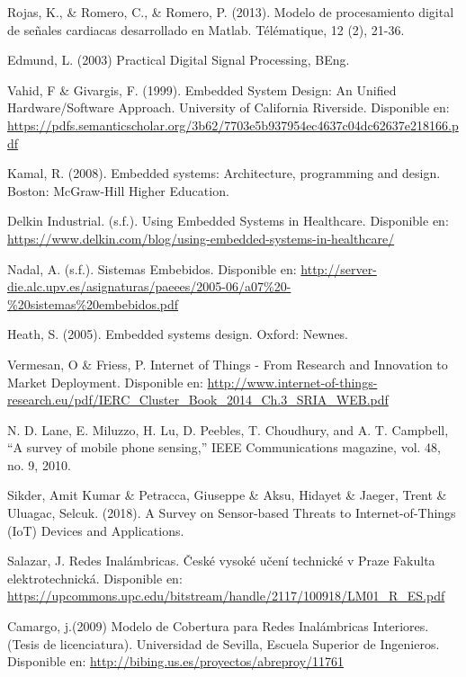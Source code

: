 \begin{thebibliography}{0}
	 Rojas, K., \& Romero, C., \& Romero, P. (2013). Modelo de procesamiento digital de señales cardiacas desarrollado en Matlab. Télématique, 12 (2), 21-36.
	
	 Edmund, L. (2003) Practical Digital Signal Processing, BEng.
	
		Vahid, F \& Givargis, F. (1999). Embedded System Design: An Unified Hardware/Software Approach. University of California Riverside. Disponible en: \url{https://pdfs.semanticscholar.org/3b62/7703e5b937954ec4637c04dc62637e218166.pdf}
	
	 Kamal, R. (2008). Embedded systems: Architecture, programming and design. Boston: McGraw-Hill Higher Education.
	
	 Delkin Industrial. (s.f.). Using Embedded Systems in Healthcare. Disponible en:  \url{https://www.delkin.com/blog/using-embedded-systems-in-healthcare/}
	
	 Nadal, A. (s.f.). Sistemas Embebidos. Disponible en:  \url{http://server-die.alc.upv.es/asignaturas/paeees/2005-06/a07%20-%20sistemas%20embebidos.pdf}
	
	 Heath, S. (2005). Embedded systems design. Oxford: Newnes.
	
	 Vermesan, O \& Friess, P. Internet of Things - From Research and Innovation to Market Deployment. Disponible en:  \url{http://www.internet-of-things-research.eu/pdf/IERC_Cluster_Book_2014_Ch.3_SRIA_WEB.pdf}
	
	 N. D. Lane, E. Miluzzo, H. Lu, D. Peebles, T. Choudhury, and A. T.	Campbell, “A survey of mobile phone sensing,” IEEE Communications magazine, vol. 48, no. 9, 2010.
	
	 Sikder, Amit Kumar \& Petracca, Giuseppe \& Aksu, Hidayet \& Jaeger, Trent \& Uluagac, Selcuk. (2018). A Survey on Sensor-based Threats to Internet-of-Things (IoT) Devices and Applications. 
	
	 Salazar, J. Redes Inalámbricas. České vysoké učení technické v Praze Fakulta elektrotechnická. Disponible en: \url{https://upcommons.upc.edu/bitstream/handle/2117/100918/LM01_R_ES.pdf}
	
	 Camargo, j.(2009) Modelo de Cobertura para Redes Inalámbricas Interiores. (Tesis de licenciatura). Universidad de Sevilla, Escuela Superior de Ingenieros. Disponible en: \url{http://bibing.us.es/proyectos/abreproy/11761}
	

\end{thebibliography}
